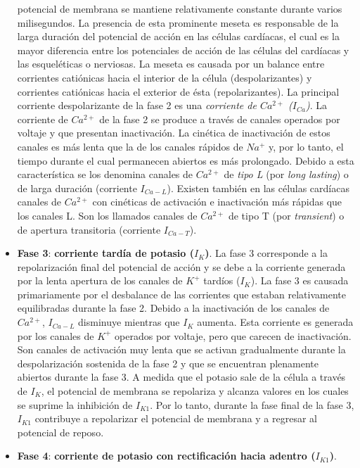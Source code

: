 \begin{itemize}
  potencial de membrana se mantiene relativamente constante durante varios milisegundos. La presencia de esta
  prominente meseta es responsable de la larga duración del potencial de acción en las células cardíacas,
  el cual es la mayor diferencia entre los potenciales de acción de las células del cardíacas y las esqueléticas
  o nerviosas. La meseta es causada por un balance entre corrientes catiónicas hacia el interior de la célula
  (despolarizantes) y corrientes catiónicas hacia el exterior de ésta (repolarizantes). La principal corriente
  despolarizante de la fase 2 es una \textit{corriente de $Ca^{2+}$ ($I_{Ca}$)}. La corriente de $Ca^{2+}$ de la
  fase 2 se produce a través de canales operados por voltaje y que presentan inactivación. La cinética de inactivación
  de estos canales es más lenta que la de los canales rápidos de $Na^+$ y, por lo tanto, el tiempo durante el
  cual permanecen abiertos es más prolongado. Debido a esta característica se los denomina canales de $Ca^{2+}$
  de \textit{tipo L} (por \textit{long lasting}) o de larga duración (corriente $I_{Ca-L}$). Existen también en
  las células cardíacas canales de $Ca^{2+}$ con cinéticas de activación e inactivación más rápidas que los canales
  L. Son los llamados canales de $Ca^{2+}$ de tipo T (por \textit{transient}) o de apertura transitoria
  (corriente $I_{Ca-T}$).
  \item \textbf{Fase 3}: \textbf{corriente tardía de potasio ($I_K$)}. La fase 3 corresponde a la repolarización
  final del potencial de acción y se debe a la corriente generada por la lenta apertura de los canales de $K^+$
  tardíos ($I_K$). La fase 3 es causada primariamente por el desbalance de las corrientes que estaban relativamente
  equilibradas durante la fase 2. Debido a la inactivación de los canales de $Ca^{2+}$, $I_{Ca-L}$ disminuye
  mientras que $I_K$ aumenta. Esta corriente es generada por los canales de $K^+$ operados por voltaje,
  pero que carecen de inactivación. Son canales de activación muy lenta que se activan gradualmente durante la
  despolarización sostenida de la fase 2 y que se encuentran plenamente abiertos durante la fase 3.
  A medida que el potasio sale de la célula a través de $I_K$, el potencial de membrana se repolariza
  y alcanza valores en los cuales se suprime la inhibición de $I_{K1}$. Por lo tanto, durante la fase
  final de la fase 3, $I_{K1}$ contribuye a repolarizar el potencial de membrana y a regresar al potencial de reposo.
  \item \textbf{Fase 4}: \textbf{corriente de potasio con rectificación hacia adentro ($I_{K1}$)}.

\end{itemize}
